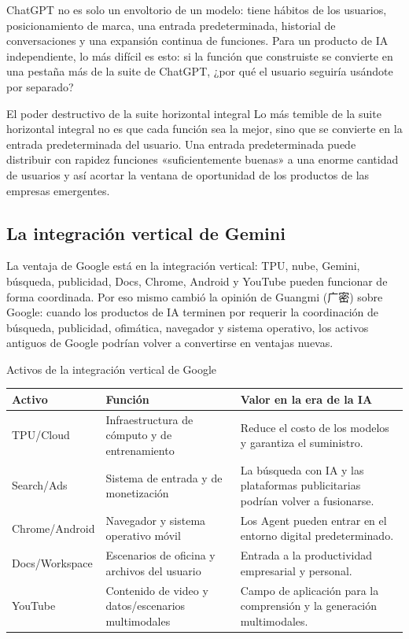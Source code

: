 \documentclass[a4paper]{article}
\begin{document}
ChatGPT no es solo un envoltorio de un modelo: tiene hábitos de los usuarios, posicionamiento de marca, una entrada predeterminada, historial de conversaciones y una expansión continua de funciones. Para un producto de IA independiente, lo más difícil es esto: si la función que construiste se convierte en una pestaña más de la suite de ChatGPT, ¿por qué el usuario seguiría usándote por separado?

\begin{importantbox}{El poder destructivo de la suite horizontal integral}
Lo más temible de la suite horizontal integral no es que cada función sea la mejor, sino que se convierte en la entrada predeterminada del usuario. Una entrada predeterminada puede distribuir con rapidez funciones «suficientemente buenas» a una enorme cantidad de usuarios y así acortar la ventana de oportunidad de los productos de las empresas emergentes.
\end{importantbox}

\subsection{La integración vertical de Gemini}

La ventaja de Google está en la integración vertical: TPU, nube, Gemini, búsqueda, publicidad, Docs, Chrome, Android y YouTube pueden funcionar de forma coordinada. Por eso mismo cambió la opinión de Guangmi (广密) sobre Google: cuando los productos de IA terminen por requerir la coordinación de búsqueda, publicidad, ofimática, navegador y sistema operativo, los activos antiguos de Google podrían volver a convertirse en ventajas nuevas.

\begin{knowledgebox}{Activos de la integración vertical de Google}
\begin{tabularx}{\textwidth}{p{}p{}X}
\toprule
Activo & Función & Valor en la era de la IA \\
\midrule
TPU/Cloud & Infraestructura de cómputo y de entrenamiento & Reduce el costo de los modelos y garantiza el suministro. \\
Search/Ads & Sistema de entrada y de monetización & La búsqueda con IA y las plataformas publicitarias podrían volver a fusionarse. \\
Chrome/Android & Navegador y sistema operativo móvil & Los Agent pueden entrar en el entorno digital predeterminado. \\
Docs/Workspace & Escenarios de oficina y archivos del usuario & Entrada a la productividad empresarial y personal. \\
YouTube & Contenido de video y datos/escenarios multimodales & Campo de aplicación para la comprensión y la generación multimodales. \\
\bottomrule
\end{tabularx}
\end{knowledgebox}
\end{document}
